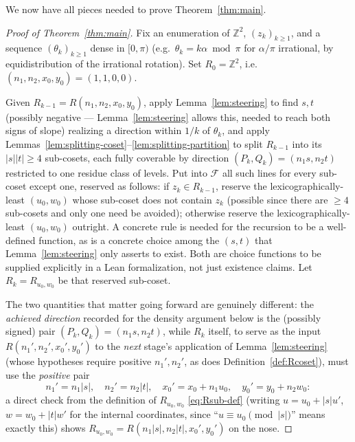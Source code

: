 \documentclass[a4paper,11pt,oneside,reqno]{amsart}
\theoremstyle{definition}
\theoremstyle{remark}
\theoremstyle{plain}
\newcommand{\Z}{\mathbb{Z}}
\begin{document}
We now have all pieces needed to prove Theorem~\ref{thm:main}.

\begin{proof}[Proof of Theorem~\ref{thm:main}]
  Fix an enumeration of \(\Z^2\), \((z_k)_{k\ge1}\), and a sequence \((\theta_k)_{k\ge1}\) dense in
  \([0,\pi)\) (e.g.\ \(\theta_k=k\alpha\bmod\pi\) for \(\alpha/\pi\) irrational, by equidistribution of
  the irrational rotation). Set \(R_0=\Z^2\), i.e.\ \((n_1,n_2,x_0,y_0)=(1,1,0,0)\).

  Given \(R_{k-1}=R(n_1,n_2,x_0,y_0)\), apply Lemma~\ref{lem:steering} to find \(s,t\) (possibly
  negative --- Lemma~\ref{lem:steering} allows this, needed to reach both signs of slope) realizing
  a direction within \(1/k\) of \(\theta_k\), and apply
  Lemmas~\ref{lem:splitting-coset}--\ref{lem:splitting-partition} to split \(R_{k-1}\) into its
  \(|s||t|\ge4\) sub-cosets, each fully coverable by direction \((P_k,Q_k)=(n_1s,n_2t)\) restricted
  to one residue class of levels. Put into \(\mathcal F\) all such lines for every sub-coset except
  one, reserved as follows: if \(z_k\in R_{k-1}\), reserve the lexicographically-least \((u_0,w_0)\)
  whose sub-coset does not contain \(z_k\) (possible since there are \(\ge4\) sub-cosets and only one
  need be avoided); otherwise reserve the lexicographically-least \((u_0,w_0)\) outright. A concrete
  rule is needed for the recursion to be a well-defined function, as is a concrete choice among the
  \((s,t)\) that Lemma~\ref{lem:steering} only asserts to exist. Both are choice functions to be
  supplied explicitly in a Lean formalization, not just existence claims. Let
  \(R_k=R_{u_0,w_0}\) be that reserved sub-coset.

  The two quantities that matter going forward are
  genuinely different: the \emph{achieved direction} recorded for the density argument below is
  the (possibly signed) pair \((P_k,Q_k)=(n_1s,n_2t)\), while \(R_k\) itself, to serve as the input
  \(R(n_1',n_2',x_0',y_0')\) to the \emph{next} stage's application of Lemma~\ref{lem:steering}
  (whose hypotheses require positive \(n_1',n_2'\), as does Definition~\ref{def:Rcoset}), must use
  the \emph{positive} pair
  \[
    n_1'=n_1|s|, \quad n_2'=n_2|t|, \quad x_0'=x_0+n_1u_0, \quad y_0'=y_0+n_2w_0:
  \]
  a direct check from the definition of \(R_{u_0,w_0}\) \eqref{eq:Rsub-def} (writing \(u=u_0+|s|u'\),
  \(w=w_0+|t|w'\) for the internal coordinates, since ``\(u\equiv u_0\pmod{|s|}\)'' means exactly this)
  shows \(R_{u_0,w_0}=R(n_1|s|,n_2|t|,x_0',y_0')\) on the nose.


\end{proof}
\end{document}
